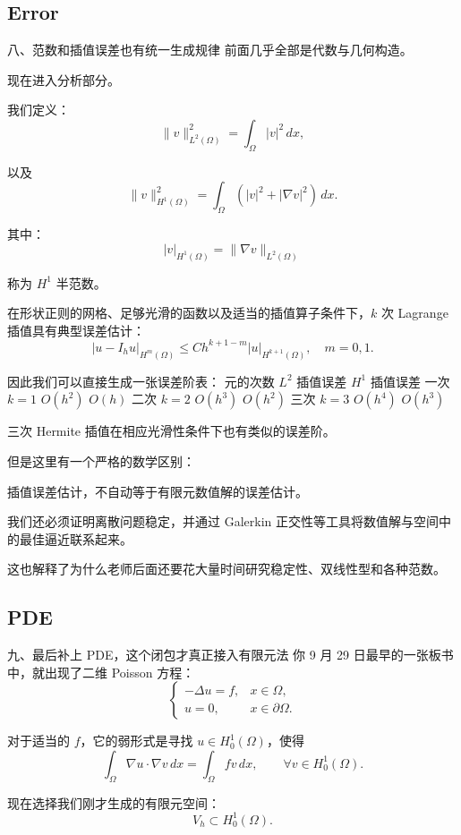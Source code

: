 \subsection{Error}
八、范数和插值误差也有统一生成规律
前面几乎全部是代数与几何构造。

现在进入分析部分。

我们定义：
\[
    \|v\|_{L^2(\Omega)}^2
    =\int_\Omega |v|^2\,dx,
\]

以及
\[
    \|v\|_{H^1(\Omega)}^2
    =
    \int_\Omega
    \left(|v|^2+|\nabla v|^2\right)\,dx.
\]

其中：
\[
    |v|_{H^1(\Omega)}
    =\|\nabla v\|_{L^2(\Omega)}
\]

称为 \(H^1\) 半范数。

在形状正则的网格、足够光滑的函数以及适当的插值算子条件下，\(k\) 次 Lagrange 插值具有典型误差估计：
\[
    \boxed{
        |u-I_hu|_{H^m(\Omega)}
        \le
        Ch^{k+1-m}|u|_{H^{k+1}(\Omega)},
        \quad m=0,1.
    }
\]

因此我们可以直接生成一张误差阶表：
元的次数	\(L^2\) 插值误差	\(H^1\) 插值误差
一次 \(k=1\)	\(O(h^2)\)	\(O(h)\)
二次 \(k=2\)	\(O(h^3)\)	\(O(h^2)\)
三次 \(k=3\)	\(O(h^4)\)	\(O(h^3)\)

三次 Hermite 插值在相应光滑性条件下也有类似的误差阶。

但是这里有一个严格的数学区别：

插值误差估计，不自动等于有限元数值解的误差估计。

我们还必须证明离散问题稳定，并通过 Galerkin 正交性等工具将数值解与空间中的最佳逼近联系起来。

这也解释了为什么老师后面还要花大量时间研究稳定性、双线性型和各种范数。


\subsection{PDE}
九、最后补上 PDE，这个闭包才真正接入有限元法
你 9 月 29 日最早的一张板书中，就出现了二维 Poisson 方程：
\[
    \begin{cases}
        -\Delta u=f, & x\in\Omega,         \\
        u=0,         & x\in\partial\Omega.
    \end{cases}
\]

对于适当的 \(f\)，它的弱形式是寻找 \(u\in H_0^1(\Omega)\)，使得
\[
    \boxed{
        \int_\Omega\nabla u\cdot\nabla v\,dx
        =
        \int_\Omega fv\,dx,
        \qquad\forall v\in H_0^1(\Omega).
    }
\]

现在选择我们刚才生成的有限元空间：
\[
    V_h\subset H_0^1(\Omega).
\]

